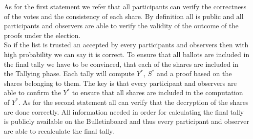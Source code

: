 \noindent
As for the first statement we refer that all participants can verify the correctness of the votes and the consistency of each share. By definition all is public and all participants and observers are able to verify the validity of the outcome of the proofs under the election.\\

\noindent
So if the list is trusted an accepted by every participants and observers then with high probability we can say it is correct. To ensure that all ballots are included in the final tally we have to be convinced,  that each of the shares are included in the Tallying phase. Each tally will compute $Y^*$, $S^*$ and a proof based on the shares belonging to them. The key is that every participant and observers are able to confirm the $Y^*$ to ensure that all shares are included in the computation of $Y^*$. As for the second statement all can verify that the decryption of the shares are done correctly. All information needed in order for calculating the final tally is publicly available on the Bulletinboard and thus every participant and observer are able to recalculate the final tally.      

